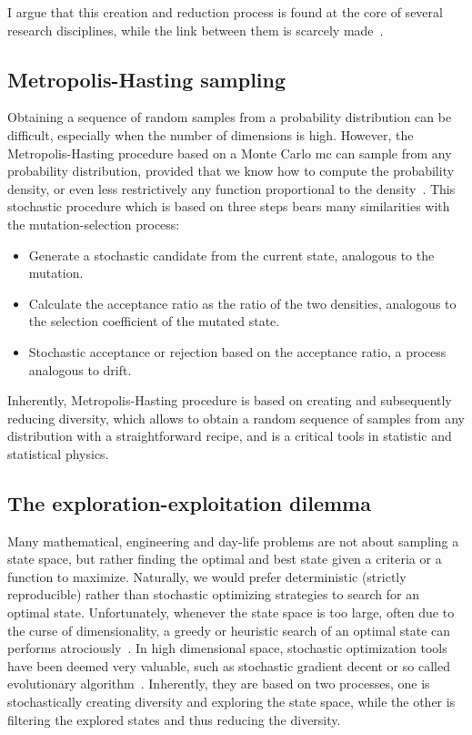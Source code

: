 I argue that this creation and reduction process is found at the core of several research disciplines, while the link between them is scarcely made~\citep{Baeck1994, Eiben1998}.

\subsection{Metropolis-Hasting sampling}
Obtaining a sequence of random samples from a probability distribution can be difficult, especially when the number of dimensions is high.
However, the Metropolis-Hasting procedure based on a Monte Carlo \gls{mc} can sample from any probability distribution, provided that we know how to compute the probability density, or even less restrictively any function proportional to the density~\citep{Hastings1970}.
This stochastic procedure which is based on three steps bears many similarities with the mutation-selection process:
\begin{itemize}
    \item Generate a stochastic candidate from the current state, analogous to the mutation.
    \item Calculate the acceptance ratio as the ratio of the two densities, analogous to the selection coefficient of the mutated state.
    \item Stochastic acceptance or rejection based on the acceptance ratio, a process analogous to drift.
\end{itemize}
Inherently, Metropolis-Hasting procedure is based on creating and subsequently reducing diversity, which allows to obtain a random sequence of samples from any distribution with a straightforward recipe, and is a critical tools in statistic and statistical physics.

\subsection{The exploration-exploitation dilemma}
Many mathematical, engineering and day-life problems are not about sampling a state space, but rather finding the optimal and best state given a criteria or a function to maximize.
Naturally, we would prefer deterministic (strictly reproducible) rather than stochastic optimizing strategies to search for an optimal state.
Unfortunately, whenever the state space is too large, often due to the curse of dimensionality, a greedy or heuristic search of an optimal state can performs atrociously~\citep{Bellman1966}.
In high dimensional space, stochastic optimization tools have been deemed very valuable, such as stochastic gradient decent or so called evolutionary algorithm~\citep{Russell2010,Vikhar2017}.
Inherently, they are based on two processes, one is stochastically creating diversity and exploring the state space, while the other is filtering the explored states and thus reducing the diversity.

